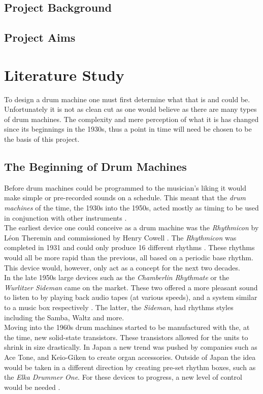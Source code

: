 \documentclass[12pt,a4paper]{report}
\begin{document}
\section{Project Background}
\section{Project Aims}

\chapter{Literature Study}
To design a drum machine one must first determine what that is and could be. Unfortunately it is not as clean cut as one would believe as there are many types of drum machines. The complexity and mere perception of what it is has changed since its beginnings in the 1930s, thus a point in time will need be chosen to be the basis of this project.
\section{The Beginning of Drum Machines}
Before drum machines could be programmed to the musician's liking it would make simple or pre-recorded sounds on a schedule. This meant that the \textit{drum machines} of the time, the 1930s into the 1950s, acted mostly as timing to be used in conjunction with other instruments \cite{rhythmart}. \\
The earliest device one could conceive as a drum machine was the \textit{Rhythmicon} by L\'eon Theremin and commissioned by Henry Cowell \cite{rhythmart, beatgoeson}. The \textit{Rhythmicon} was completed in 1931 and could only produce 16 different rhythms \cite{schedel}. These rhythms would all be more rapid than the previous, all based on a periodic base rhythm. This device would, however, only act as a concept for the next two decades. \\
In the late 1950s large devices such as the \textit{Chamberlin Rhythmate} or the \textit{Wurlitzer Sideman} came on the market. These two offered a more pleasant sound to listen to by playing back audio tapes (at various speeds), and a system similar to a music box respectively \cite{rhythmart, beatgoeson}. The latter, the \textit{Sideman}, had rhythms styles including the Samba, Waltz and more\cite{WangOliver2014Htdm}. \\
Moving into the 1960s drum machines started to be manufactured with the, at the time, new solid-state transistors. These transistors allowed for the units to shrink in size drastically. In Japan a new trend was pushed by companies such as Ace Tone, and Keio-Giken to create organ accessories. Outside of Japan the idea would be taken in a different direction by creating pre-set rhythm boxes, such as the \textit{Elka Drummer One}. For these devices to progress, a new level of control would be needed \cite{rhythmart}.
\end{document}
